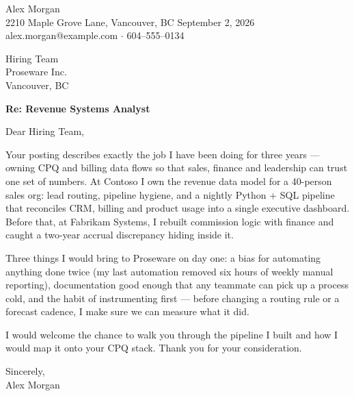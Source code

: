 \documentclass[letterpaper,11pt]{article}
\begin{document}
Alex Morgan \\
2210 Maple Grove Lane, Vancouver, BC \hfill September 2, 2026 \\
alex.morgan@example.com $\cdot$ 604--555--0134

\vspace{18pt}
Hiring Team \\
Proseware Inc. \\
Vancouver, BC

\vspace{18pt}
\textbf{Re: Revenue Systems Analyst}

\vspace{10pt}
Dear Hiring Team,

Your posting describes exactly the job I have been doing for three years — owning CPQ and billing data flows so that sales, finance and leadership can trust one set of numbers. At Contoso I own the revenue data model for a 40-person sales org: lead routing, pipeline hygiene, and a nightly Python + SQL pipeline that reconciles CRM, billing and product usage into a single executive dashboard. Before that, at Fabrikam Systems, I rebuilt commission logic with finance and caught a two-year accrual discrepancy hiding inside it.

Three things I would bring to Proseware on day one: a bias for automating anything done twice (my last automation removed six hours of weekly manual reporting), documentation good enough that any teammate can pick up a process cold, and the habit of instrumenting first — before changing a routing rule or a forecast cadence, I make sure we can measure what it did.

I would welcome the chance to walk you through the pipeline I built and how I would map it onto your CPQ stack. Thank you for your consideration.

\vspace{18pt}
Sincerely,\\
Alex Morgan
\end{document}
